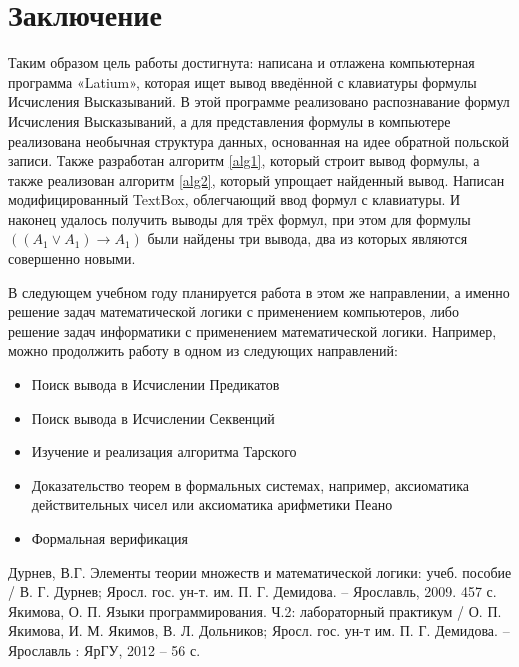 \documentclass[a4paper,12pt]{article}
\theoremstyle{definition}
\begin{document}
	\section*{Заключение}
	Таким образом цель работы достигнута: написана и отлажена компьютерная программа «Latium», которая ищет вывод введённой с клавиатуры формулы Исчисления Высказываний. В этой программе реализовано распознавание формул Исчисления Высказываний, а для представления формулы в компьютере реализована необычная структура данных, основанная на идее обратной польской записи. Также разработан алгоритм \ref{alg1}, который строит вывод формулы, а также реализован алгоритм \ref{alg2}, который упрощает найденный вывод. Написан модифицированный TextBox, облегчающий ввод формул с клавиатуры. И наконец удалось получить выводы для трёх формул, при этом для формулы  $\left( \left( A_{1} \lor A_{1}\right) \to A_{1}\right)  $ были найдены три вывода, два из которых являются совершенно новыми.
	
	В следующем учебном году планируется работа в этом же направлении, а именно решение задач математической логики с применением компьютеров, либо решение задач информатики с применением математической логики. Например, можно продолжить работу в одном из следующих направлений:
	\begin{itemize}
		\item Поиск вывода в Исчислении Предикатов
		\item Поиск вывода в Исчислении Секвенций
		\item Изучение и реализация алгоритма Тарского
		\item Доказательство теорем в формальных системах, например, аксиоматика действительных чисел или аксиоматика арифметики Пеано
		\item Формальная верификация
		
		
	\end{itemize}
	
	\begin{thebibliography}{3}
		Дурнев, В.Г. Элементы теории множеств и математической логики: учеб. пособие / В. Г. Дурнев; Яросл. гос. ун-т. им. П. Г. Демидова. – Ярославль, 2009. 457 с. 
		Якимова, О. П. Языки программирования. Ч.2: лабораторный практикум / О. П. Якимова, И. М. Якимов, В. Л. Дольников; Яросл. гос. ун-т им. П. Г. Демидова. – Ярославль : ЯрГУ, 2012 – 56 с.  
	\end{thebibliography}
	
\end{document}
